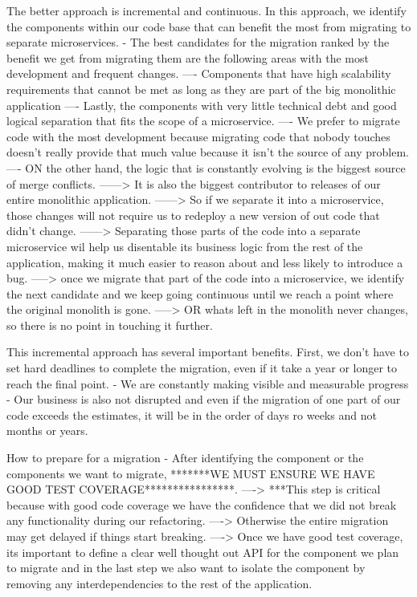 \documentclass[a4paper, 11pt]{book}
\begin{document}
    The better approach is incremental and continuous.
    In this approach, we identify the components within our code base that can benefit the most from migrating to separate microservices.
    - The best candidates for the migration ranked by the benefit we get from migrating them are the following areas with the most development and frequent changes.
    ---- Components that have high scalability requirements that cannot be met as long as they are part of the big monolithic application
    ---- Lastly, the components with very little technical debt and good logical separation that fits the scope of a microservice.
    ---- We prefer to migrate code with the most development because migrating code that nobody touches doesn't really provide that much value because it isn't the source of any problem.
    ---- ON the other hand, the logic that is constantly evolving is the biggest source of merge conflicts.
    ------> It is also the biggest contributor to releases of our entire monolithic application.
    ------> So if we separate it into a microservice, those changes will not require us to redeploy a new version of out code that didn't change.
    ------> Separating those parts of the code into a separate microservice wil help us disentable its business logic from the rest of the application, making it much easier to reason about and less likely to introduce a bug.
    -----> once we migrate that part of the code into a microservice, we identify the next candidate and we keep going continuous until we reach a point where the original monolith is gone.
    -----> OR whats left in the monolith never changes, so there is no point in touching it further.

    This incremental approach has several important benefits.
    First, we don't have to set hard deadlines to complete the migration, even if it take a year or longer to reach the final point.
    - We are constantly making visible and measurable progress
    - Our business is also not disrupted and even if the migration of one part of our code exceeds the estimates, it will be in the order of days ro weeks and not months or years.

    How to prepare for a migration
    - After identifying the component or the components we want to migrate, *******WE MUST ENSURE WE HAVE GOOD TEST COVERAGE****************.
    ----> ***This step is critical because with good code coverage we have the confidence that we did not break any functionality during our refactoring.
    ----> Otherwise the entire migration may get delayed if things start breaking.
    ----> Once we have good test coverage, its important to define a clear well thought out API for the component we plan to migrate and in the last step we also want to isolate the component by removing any interdependencies to the rest of the application.
\end{document}
